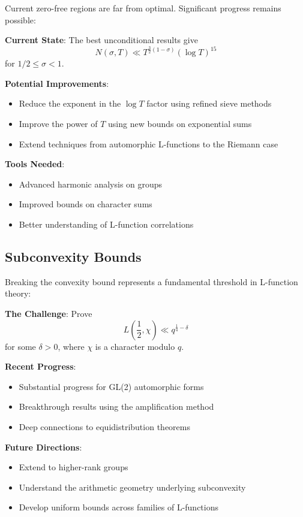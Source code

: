 Current zero-free regions are far from optimal. Significant progress remains possible:

\begin{research_direction}
\textbf{Current State}: The best unconditional results give
\begin{equation}
N(\sigma, T) \ll T^{\frac{3}{2}(1-\sigma)} (\log T)^{15}
\end{equation}
for $1/2 \leq \sigma < 1$.

\textbf{Potential Improvements}:
\begin{itemize}
\item Reduce the exponent in the $\log T$ factor using refined sieve methods
\item Improve the power of $T$ using new bounds on exponential sums
\item Extend techniques from automorphic L-functions to the Riemann case
\end{itemize}

\textbf{Tools Needed}: 
\begin{itemize}
\item Advanced harmonic analysis on groups
\item Improved bounds on character sums
\item Better understanding of L-function correlations
\end{itemize}
\end{research_direction}

\subsection{Subconvexity Bounds}
\label{subsec:subconvexity}

Breaking the convexity bound represents a fundamental threshold in L-function theory:

\begin{research_direction}
\textbf{The Challenge}: Prove
\begin{equation}
L\left(\frac{1}{2}, \chi\right) \ll q^{\frac{1}{4}-\delta}
\end{equation}
for some $\delta > 0$, where $\chi$ is a character modulo $q$.

\textbf{Recent Progress}:
\begin{itemize}
\item Substantial progress for GL(2) automorphic forms
\item Breakthrough results using the amplification method
\item Deep connections to equidistribution theorems
\end{itemize}

\textbf{Future Directions}:
\begin{itemize}
\item Extend to higher-rank groups
\item Understand the arithmetic geometry underlying subconvexity
\item Develop uniform bounds across families of L-functions
\end{itemize}
\end{research_direction}

